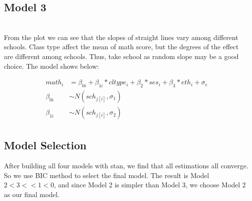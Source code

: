 \documentclass{article}
\begin{document}
\subsection{Model 3}

\begin{minipage}{\linewidth}
    \label{fig:random slope}
\end{minipage}\\

From the plot we can see that the slopes of straight lines vary among different schools. Class type affect the mean of math score, 
but the degrees of the effect are different among schools. Thus, take school as random slope may be a good choice. The model shows below:

\begin{align*}
    math_i &= \beta_{0i} + \beta_{1i}*cltype_i + \beta_2*ses_i + \beta_3*eth_i + \sigma_e\\
    \beta_{0i} &\sim N(sch_{j[i]}, \sigma_1)\\
    \beta_{1i} &\sim N(sch_{j[i]}, \sigma_2)\\
\end{align*}

\subsection{Model Selection}

After building all four models with stan, we find that all estimations all converge. So we use BIC method to select the final model. 
The result is Model $2<3<<1<0$, and since Model 2 is simpler than Model 3, we choose Model 2 as our final model.
\end{document}
